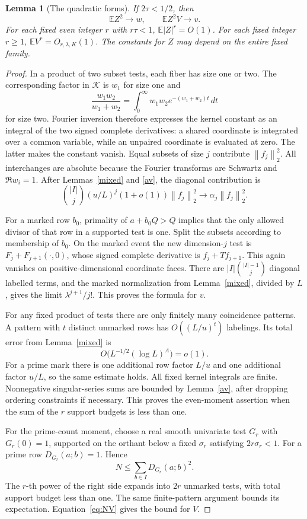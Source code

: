 \documentclass[11pt]{article}
\newtheorem{lemma}[theorem]{Lemma}
\theoremstyle{remark}
\numberwithin{equation}{section}
\newcommand{\E}{\mathbb E}
\newcommand{\norm}[1]{\left\lVert#1\right\rVert}
\begin{document}
\begin{lemma}[The quadratic forms]\label{forms}
If $2\tau<1/2$, then
\[
 \E Z^2\longrightarrow w,\qquad
 \E Z^2V\longrightarrow v.
\]
For each fixed even integer $r$ with $r\tau<1$,
$\E|Z|^r=O(1)$. For each fixed integer $r\ge1$,
$\E V^r=O_{r,\lambda,K}(1)$.
The constants for $Z$ may depend on the entire fixed family.
\end{lemma}
\begin{proof}
In a product of two subset tests, each fiber has size one or two.
The corresponding factor in $\mathcal K$ is $w_1$ for size one
and
\[
 \frac{w_1w_2}{w_1+w_2}
   =\int_0^\infty w_1w_2e^{-(w_1+w_2)t}\,dt
\]
for size two. Fourier inversion therefore expresses the kernel
constant as an integral of the two signed complete derivatives:
a shared coordinate is integrated over a common variable, while
an unpaired coordinate is evaluated at zero. The latter makes
the constant vanish. Equal subsets of size $j$ contribute
$\norm{f_j}_2^2$. All interchanges are absolute because the
Fourier transforms are Schwartz and $\Re w_i=1$.
After Lemmas~\ref{mixed} and \ref{av}, the diagonal contribution is
\[
 \binom{|I|}{j}(u/L)^j(1+o(1))\norm{f_j}_2^2
       \longrightarrow\alpha_j\norm{f_j}_2^2.
\]

For a marked row $b_0$, primality of $a+b_0Q>Q$ implies that
the only allowed divisor of that row in a supported test is one.
Split the subsets according to membership of $b_0$.
On the marked event the new dimension-$j$ test is
$F_j+F_{j+1}(\cdot,0)$, whose signed complete derivative is
$f_j+Tf_{j+1}$. This again vanishes on positive-dimensional
coordinate faces. There are
$|I|\binom{|I|-1}{j}$ diagonal labelled terms, and the marked
normalization from Lemma~\ref{mixed}, divided by $L$, gives
the limit $\lambda^{j+1}/j!$. This proves the formula for $v$.

For any fixed product of tests there are only finitely many
coincidence patterns. A pattern with $t$ distinct unmarked rows
has $O((L/u)^t)$ labelings. Its total error from
Lemma~\ref{mixed} is
\[
 O\bigl(L^{-1/2}(\log L)^A\bigr)=o(1).
\]
For a prime mark there is one additional row factor $L/u$
and one additional factor $u/L$, so the same estimate holds.
All fixed kernel integrals are finite. Nonnegative singular-series
sums are bounded by Lemma~\ref{av}, after dropping ordering
constraints if necessary. This proves the even-moment assertion
when the sum of the $r$ support budgets is less than one.

For the prime-count moment, choose a real smooth univariate test
$G_r$ with $G_r(0)=1$, supported on the orthant below a fixed
$\sigma_r$ satisfying $2r\sigma_r<1$.
For a prime row $D_{G_r}(a;b)=1$. Hence
\[
 N\le \sum_{b\in I}D_{G_r}(a;b)^2.
\]
The $r$-th power of the right side expands into $2r$ unmarked
tests, with total support budget less than one.
The same finite-pattern argument bounds its expectation.
Equation~\eqref{eq:NV} gives the bound for $V$.
\end{proof}
\end{document}
